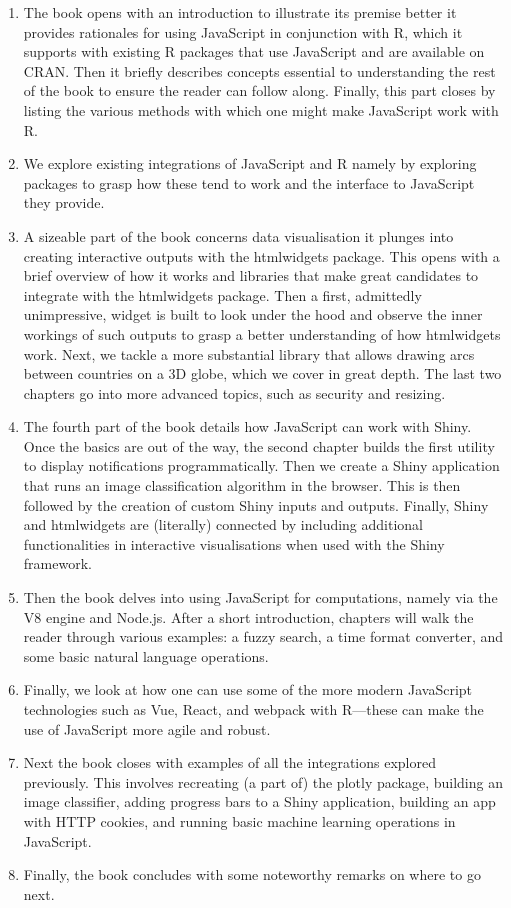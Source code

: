 \documentclass[10pt,]{krantz}
\begin{document}
\begin{enumerate}
\def\labelenumi{\arabic{enumi}.}
\item
  The book opens with an introduction to illustrate its premise better it provides rationales for using JavaScript in conjunction with R, which it supports with existing R packages that use JavaScript and are available on CRAN. Then it briefly describes concepts essential to understanding the rest of the book to ensure the reader can follow along. Finally, this part closes by listing the various methods with which one might make JavaScript work with R.
\item
  We explore existing integrations of JavaScript and R namely by exploring packages to grasp how these tend to work and the interface to JavaScript they provide.
\item
  A sizeable part of the book concerns data visualisation it plunges into creating interactive outputs with the htmlwidgets package. This opens with a brief overview of how it works and libraries that make great candidates to integrate with the htmlwidgets package. Then a first, admittedly unimpressive, widget is built to look under the hood and observe the inner workings of such outputs to grasp a better understanding of how htmlwidgets work. Next, we tackle a more substantial library that allows drawing arcs between countries on a 3D globe, which we cover in great depth. The last two chapters go into more advanced topics, such as security and resizing.
\item
  The fourth part of the book details how JavaScript can work with Shiny. Once the basics are out of the way, the second chapter builds the first utility to display notifications programmatically. Then we create a Shiny application that runs an image classification algorithm in the browser. This is then followed by the creation of custom Shiny inputs and outputs. Finally, Shiny and htmlwidgets are (literally) connected by including additional functionalities in interactive visualisations when used with the Shiny framework.
\item
  Then the book delves into using JavaScript for computations, namely via the V8 engine and Node.js. After a short introduction, chapters will walk the reader through various examples: a fuzzy search, a time format converter, and some basic natural language operations.
\item
  Finally, we look at how one can use some of the more modern JavaScript technologies such as Vue, React, and webpack with R---these can make the use of JavaScript more agile and robust.
\item
  Next the book closes with examples of all the integrations explored previously. This involves recreating (a part of) the plotly package, building an image classifier, adding progress bars to a Shiny application, building an app with HTTP cookies, and running basic machine learning operations in JavaScript.
\item
  Finally, the book concludes with some noteworthy remarks on where to go next.
\end{enumerate}
\end{document}
